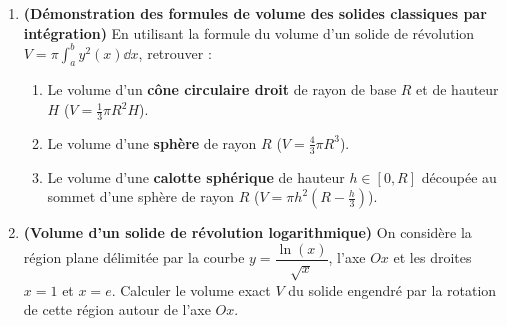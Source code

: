 \begin{enumerate}[label=\textbf{Exercice 7.\arabic* --}]
    \item \textbf{(Démonstration des formules de volume des solides classiques par intégration)}
    En utilisant la formule du volume d'un solide de révolution $V = \pi \int_a^b y^2(x)\dd x$, retrouver :
    \begin{enumerate}
        \item Le volume d'un \textbf{cône circulaire droit} de rayon de base $R$ et de hauteur $H$ ($V = \frac{1}{3}\pi R^2 H$).
        \item Le volume d'une \textbf{sphère} de rayon $R$ ($V = \frac{4}{3}\pi R^3$).
        \item Le volume d'une \textbf{calotte sphérique} de hauteur $h \in [0, R]$ découpée au sommet d'une sphère de rayon $R$ ($V = \pi h^2\left(R - \frac{h}{3}\right)$).
    \end{enumerate}

    \item \textbf{(Volume d'un solide de révolution logarithmique)} On considère la région plane délimitée par la courbe $y = \dfrac{\ln(x)}{\sqrt{x}}$, l'axe $Ox$ et les droites $x = 1$ et $x = e$. Calculer le volume exact $V$ du solide engendré par la rotation de cette région autour de l'axe $Ox$.
\end{enumerate}
